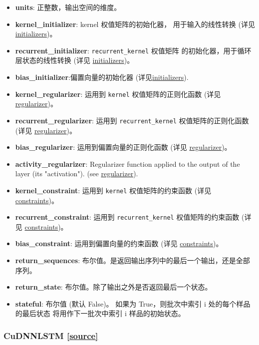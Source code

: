 \begin{itemize}
\tightlist
\item
  \textbf{units}: 正整数，输出空间的维度。
\item
  \textbf{kernel\_initializer}: kernel 权值矩阵的初始化器，
  用于输入的线性转换 (详见 \hyperref[initializers]{initializers})。
\item
  \textbf{recurrent\_initializer}: \texttt{recurrent\_kernel} 权值矩阵
  的初始化器，用于循环层状态的线性转换 (详见
  \hyperref[initializers]{initializers})。
\item
  \textbf{bias\_initializer}:偏置向量的初始化器
  (详见\hyperref[initializers]{initializers}).
\item
  \textbf{kernel\_regularizer}: 运用到 \texttt{kernel}
  权值矩阵的正则化函数 (详见 \hyperref[regularizers]{regularizer})。
\item
  \textbf{recurrent\_regularizer}: 运用到 \texttt{recurrent\_kernel}
  权值矩阵的正则化函数 (详见 \hyperref[regularizers]{regularizer})。
\item
  \textbf{bias\_regularizer}: 运用到偏置向量的正则化函数 (详见
  \hyperref[regularizers]{regularizer})。
\item
  \textbf{activity\_regularizer}: Regularizer function applied to the
  output of the layer (its "activation"). (see
  \hyperref[regularizers]{regularizer}).
\item
  \textbf{kernel\_constraint}: 运用到 \texttt{kernel} 权值矩阵的约束函数
  (详见 \hyperref[constraints]{constraints})。
\item
  \textbf{recurrent\_constraint}: 运用到 \texttt{recurrent\_kernel}
  权值矩阵的约束函数 (详见 \hyperref[constraints]{constraints})。
\item
  \textbf{bias\_constraint}: 运用到偏置向量的约束函数 (详见
  \hyperref[constraints]{constraints})。
\item
  \textbf{return\_sequences}:
  布尔值。是返回输出序列中的最后一个输出，还是全部序列。
\item
  \textbf{return\_state}: 布尔值。除了输出之外是否返回最后一个状态。
\item
  \textbf{stateful}: 布尔值 (默认 False)。 如果为 True，则批次中索引 i
  处的每个样品的最后状态 将用作下一批次中索引 i 样品的初始状态。
\end{itemize}




\subsubsection{CuDNNLSTM {\href{https://github.com/keras-team/keras/blob/master/keras/layers/cudnn_recurrent.py\#L324}{{[}source{]}}}}

